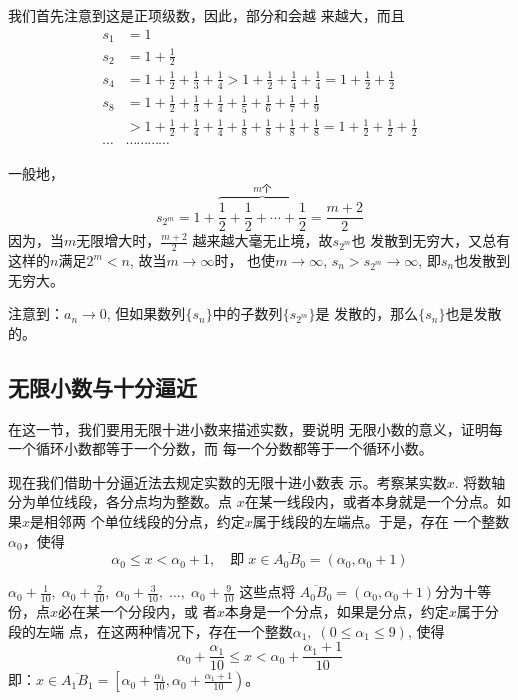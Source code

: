 \begin{solution}
    我们首先注意到这是正项级数，因此，部分和会越
来越大，而且
\[\begin{split}
    s_1&=1          \\
    s_2&=1+\frac{1}{2}          \\
    s_4&=1+\frac{1}{2}+\frac{1}{3}+\frac{1}{4}>1+\frac{1}{2}+\frac{1}{4}+\frac{1}{4}=1+\frac{1}{2}+\frac{1}{2}          \\
    s_8&=1+\frac{1}{2}+\frac{1}{3}+\frac{1}{4}+\frac{1}{5}+\frac{1}{6}+\frac{1}{7}+\frac{1}{9}          \\
    &>1+\frac{1}{2}+\frac{1}{4}+\frac{1}{4}+\frac{1}{8}+\frac{1}{8}+\frac{1}{8}+\frac{1}{8}=1+\frac{1}{2}+\frac{1}{2}+\frac{1}{2}\\
    \cdots &\cdots \cdots \cdots \cdots 
\end{split}\]

一般地，
\[s_{2^m}=1+\overbrace{\frac{1}{2}+\frac{1}{2}+\cdots +\frac{1}{2}}^{\text{$m$个}}=\frac{m+2}{2}\]    
因为，当$m$无限增大时，$\frac{m+2}{2}$
越来越大毫无止境，故$s_{2^m}$也
发散到无穷大，又总有这样的$n$满足$2^m<n$, 故当$m\to\infty$时，
也使$m\to\infty$, $s_n>s_{2^m}\to \infty$, 即$s_n$也发散到无穷大。

注意到：$a_n\to 0$, 但如果数列$\{s_n\}$中的子数列$\{s_{2^m}\}$是
发散的，那么$\{s_n\}$也是发散的。
\end{solution}

\subsection{无限小数与十分逼近}
在这一节，我们要用无限十进小数来描述实数，要说明
无限小数的意义，证明每一个循环小数都等于一个分数，而
每一个分数都等于一个循环小数。

现在我们借助十分逼近法去规定实数的无限十进小数表
示。考察某实数$x$. 将数轴分为单位线段，各分点均为整数。点
$x$在某一线段内，或者本身就是一个分点。如果$x$是相邻两
个单位线段的分点，约定$x$属于线段的左端点。于是，存在
一个整数$\alpha_0$，使得
\[\alpha_0\le x<\alpha_0+1,\quad \text{即}\; x\in \overline{A_0B_0}=(\alpha_0,\alpha_0+1)\]

$\alpha_0+\frac{1}{10},\; \alpha_0+\frac{2}{10},\; \alpha_0+\frac{3}{10},\;\ldots,\; \alpha_0+\frac{9}{10}$
这些点将
$\overline{A_0B_0}=(\alpha_0,\alpha_0+1)$分为十等份，点$x$必在某一个分段内，或
者$x$本身是一个分点，如果是分点，约定$x$属于分段的左端
点，在这两种情况下，存在一个整数$\alpha_1,\; (0\le \alpha_1\le 9)$, 使得
\[\alpha_0+\frac{\alpha_1}{10}\le x<\alpha_0+\frac{\alpha_1+1}{10}\]
即：$x\in\overline{A_1B_1}=\left[\alpha_0+\frac{\alpha_1}{10}, \alpha_0+\frac{\alpha_1+1}{10}\right)$。

